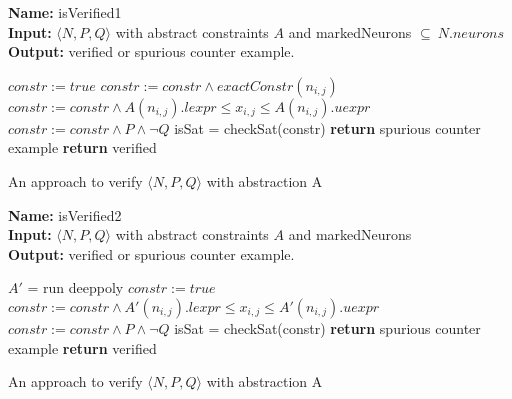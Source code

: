\begin{algorithm}[t]
  \textbf{Name: } isVerified1 \\
  \textbf{Input: } $\langle N,P,Q \rangle$ with abstract constraints $A$ and markedNeurons $\subseteq ~ N.neurons$ \\
  \textbf{Output: } verified or spurious counter example. 
  \begin{algorithmic}[1]
    \State $constr := true$
          \State $constr := constr \land exactConstr(n_{i,j})$ 
        \Else
          \State $constr := constr \land A(n_{i,j}).lexpr \leq x_{i,j} \leq A(n_{i,j}).uexpr$
        \EndIf
      \EndFor
    \EndFor
    \State $constr := constr \land P \land \neg Q$
    \State isSat = checkSat(constr)
      \State \textbf{return} spurious counter example
    \Else
      \State \textbf{return} verified
    \EndIf
  \end{algorithmic}
  \caption{An approach to verify $\langle N,P,Q \rangle$ with abstraction A}
  \label{algo:verif1}
\end{algorithm}

\begin{algorithm}[t]
  \textbf{Name: } isVerified2 \\
  \textbf{Input: } $\langle N,P,Q \rangle$ with abstract constraints $A$ and markedNeurons \\
  \textbf{Output: } verified or spurious counter example. 
  \begin{algorithmic}[1]
      \State $A'$ = run deeppoly
        \State $constr := true$
            \State $constr := constr \land A'(n_{i,j}).lexpr \leq x_{i,j} \leq A'(n_{i,j}).uexpr$
          \EndFor
        \EndFor
        \State $constr := constr  \land P \land \neg Q$ 
        \State isSat = checkSat(constr)
          \State \textbf{return} spurious counter example
        \EndIf
      \EndIf
    \EndFor
    \State \textbf{return} verified
  \end{algorithmic}
  \caption{An approach to verify $\langle N,P,Q \rangle$ with abstraction A}
  \label{algo:verif2}
\end{algorithm}



